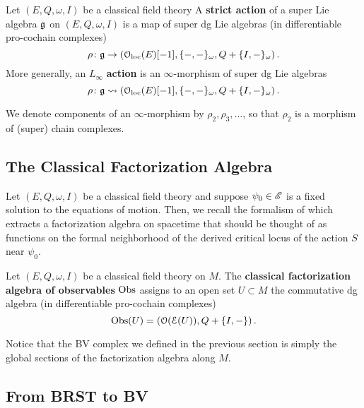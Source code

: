 \documentclass[10pt, oneside]{article}
\begin{document}
\begin{dfn}
Let $(E, Q,\omega, I)$ be a classical field theory 
A {\bf strict action} of a super Lie algebra $\mathfrak g$ on $(E, Q,\omega, I)$ is a map of super dg Lie algebras (in differentiable pro-cochain complexes)
\[
\rho\colon \mathfrak g \to \left(\mathcal{O}_{\rm loc}(E)[-1] , \{-,-\}_\omega, Q + \{I,-\}_\omega\right) .
\]
More generally, an $L_\infty$ {\bf action} is an $\infty$-morphism of super dg Lie algebras
\[
\rho\colon \mathfrak g \rightsquigarrow \left(\mathcal{O}_{\rm loc}(E)[-1] , \{-,-\}_\omega, Q + \{I,-\}_\omega\right) .
\]
\end{dfn}

We denote components of an $\infty$-morphism by $\rho_2, \rho_3, \dots$, so that $\rho_2$ is a morphism of (super) chain complexes.

\subsection{The Classical Factorization Algebra}


Let $(E, Q, \omega, I)$ be a classical field theory and suppose $\psi_0 \in \mathscr E$ is a fixed solution to the equations of motion. 
Then, we recall the formalism of \cite{CG1,CG2} which extracts a factorization algebra on spacetime that should be thought of as  functions on the formal neighborhood of the derived critical locus of the action $S$ near $\psi_0$. 

\begin{dfn}
Let $(E, Q, \omega, I)$ be a classical field theory on $M$.
The {\bf classical factorization algebra of observables} $\mathrm{Obs}$ assigns to an open set $U \subset M$ the commutative dg algebra (in differentiable pro-cochain complexes)
\[
\mathrm{Obs}(U) = \left(\mathcal O(\mathcal E(U)) , Q + \{I,-\}\right) .
\]
\end{dfn}

Notice that the BV complex we defined in the previous section is simply the global sections of the factorization algebra along $M$. 

\subsection{From BRST to BV}
\end{document}

